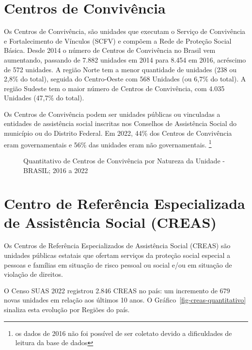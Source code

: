 \documentclass[
  letterpaper,
  DIV=11,
  numbers=noendperiod]{scrreprt}
\begin{document}
\section{Centros de Convivência}\label{centros-de-convivuxeancia}

Os Centros de Convivência, são unidades que executam o Serviço de
Convivência e Fortalecimento de Vínculos (SCFV) e compõem a Rede de
Proteção Social Básica. Desde 2014 o número de Centros de Convivência no
Brasil vem aumentando, passando de 7.882 unidades em 2014 para 8.454 em
2016, acréscimo de 572 unidades. A região Norte tem a menor quantidade
de unidades (238 ou 2,8\% do total), seguida do Centro-Oeste com 568
Unidades (ou 6,7\% do total). A região Sudeste tem o maior número de
Centros de Convivência, com 4.035 Unidades (47,7\% do total).

Os Centros de Convivência podem ser unidades públicas ou vinculadas a
entidades de assistência social inscritas nos Conselhos de Assistência
Social do município ou do Distrito Federal. Em 2022, 44\% dos Centros de
Convivência eram governamentais e 56\% das unidades eram não
governamentais. \footnote{os dados de 2016 não foi possível de ser
  coletato devido a dificuldades de leitura da base de dados}

\begin{figure}


\caption{\label{fig-centro-conv-natureza}Quantitativo de Centros de
Convivência por Natureza da Unidade - BRASIL; 2016 a 2022}

\end{figure}%

\section{Centro de Referência Especializada de Assistência Social
(CREAS)}\label{centro-de-referuxeancia-especializada-de-assistuxeancia-social-creas}

Os Centros de Referência Especializados de Assistência Social (CREAS)
são unidades públicas estatais que ofertam serviços da proteção social
especial a pessoas e famílias em situação de risco pessoal ou social
e/ou em situação de violação de direitos.

O Censo SUAS 2022 registrou 2.846 CREAS no país: um incremento de 679
novas unidades em relação aos últimos 10 anos. O
Gráfico~\ref{fig-creas-quantitativo} sinaliza esta evolução por Regiões
do país.
\end{document}
